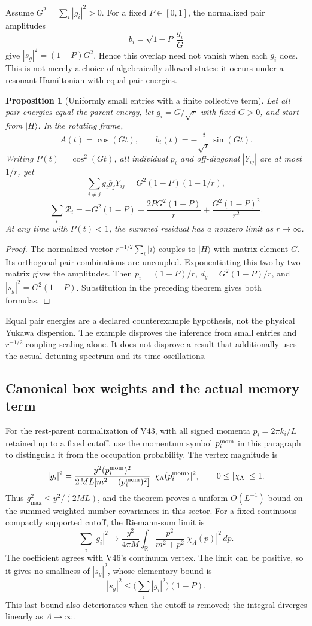 \documentclass[11pt]{article}
\newtheorem{proposition}[theorem]{Proposition}
\theoremstyle{remark}
\begin{document}
Assume \(G^2=\sum_i|g_i|^2>0\).  For a fixed \(P\in[0,1]\),
the normalized pair amplitudes
\[
 b_i=\sqrt{1-P}\,\frac{g_i}{G}
\]
give \(|s_g|^2=(1-P)G^2\).
Hence this overlap need not vanish when each \(g_i\) does.
This is not merely a choice of algebraically allowed states:
it occurs under a resonant Hamiltonian with equal pair energies.

\begin{proposition}[Uniformly small entries with a finite collective term]
\label{prop:v20v56-collective}
Let all pair energies equal the parent energy, let
\(g_i=G/\sqrt r\) with fixed \(G>0\), and start from \(|H\rangle\).
In the rotating frame,
\[
 A(t)=\cos(Gt),\qquad
 b_i(t)=-\frac{i}{\sqrt r}\sin(Gt).
\]
Writing \(P(t)=\cos^2(Gt)\), all individual \(p_i\) and
off-diagonal \(|Y_{ij}|\) are at most \(1/r\), yet
\[
 \sum_{i\ne j}g_i\overline g_jY_{ij}
          =G^2(1-P)(1-1/r),
\]
\[
 \sum_i\mathcal R_i
 =-G^2(1-P)+\frac{2PG^2(1-P)}r
                   +\frac{G^2(1-P)^2}{r^2}.
\]
At any time with \(P(t)<1\), the summed residual has a
nonzero limit as \(r\to\infty\).
\end{proposition}
\begin{proof}
The normalized vector \(r^{-1/2}\sum_i|i\rangle\) couples to
\(|H\rangle\) with matrix element \(G\).  Its orthogonal pair
combinations are uncoupled.  Exponentiating this two-by-two
matrix gives the amplitudes.  Then
\(p_i=(1-P)/r\), \(d_g=G^2(1-P)/r\), and
\(|s_g|^2=G^2(1-P)\).  Substitution in the preceding theorem
gives both formulas.
\end{proof}

Equal pair energies are a declared counterexample hypothesis,
not the physical Yukawa dispersion.  The example disproves
the inference from small entries and \(r^{-1/2}\) coupling
scaling alone.  It does not disprove a result that additionally
uses the actual detuning spectrum and its time oscillations.

\subsection{Canonical box weights and the actual memory term}

For the rest-parent normalization of V43, with all signed
momenta \(p_i=2\pi k_i/L\) retained up to a fixed cutoff, use
the momentum symbol \(p_i^{\rm mom}\) in this paragraph to
distinguish it from the occupation probability.  The vertex
magnitude is
\[
 |g_i|^2=
 \frac{y^2(p_i^{\rm mom})^2}
 {2ML[m^2+(p_i^{\rm mom})^2]}\,|\chi_\Lambda(p_i^{\rm mom})|^2,
 \qquad 0\leq|\chi_\Lambda|\leq1 .
\]
Thus \(g_{\max}^2\leq y^2/(2ML)\), and the theorem proves a
uniform \(O(L^{-1})\) bound on the summed weighted number
covariances in this sector.  For a fixed continuous compactly
supported cutoff, the Riemann-sum limit is
\[
 \sum_i|g_i|^2\longrightarrow
 \frac{y^2}{4\pi M}\int_{\mathbb R}
 \frac{p^2}{m^2+p^2}|\chi_\Lambda(p)|^2\,dp .
\]
The coefficient agrees with V46's continuum vertex.
The limit can be positive, so it gives no smallness of
\(|s_g|^2\), whose elementary bound is
\[
 |s_g|^2\leq\Big(\sum_i|g_i|^2\Big)(1-P).
\]
This last bound also deteriorates when the cutoff is removed;
the integral diverges linearly as \(\Lambda\to\infty\).
\end{document}
